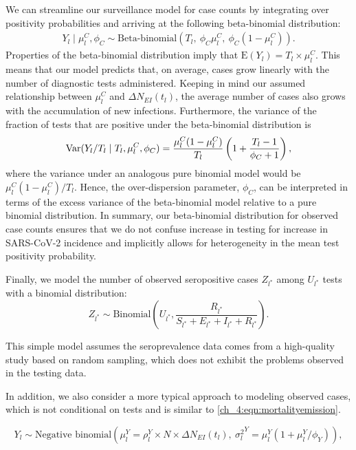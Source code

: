 \par We can streamline our surveillance model for case counts by integrating over positivity probabilities and arriving at the following beta-binomial distribution:
\begin{align}
\label{ch_4:eqn:caseemission}
Y_l\mid \mu_l^C,\phi_C \sim \text{Beta-binomial}\left (T_l,\ \phi_C \mu^C_l,\ \phi_C \left (1 - \mu^C_l\right )\right ).
\end{align}
Properties of the beta-binomial distribution imply that $\text{E}(Y_l) = T_l \times \mu^C_l$.
This means that our model predicts that, on average, cases grow linearly with the number of diagnostic tests administered.
Keeping in mind our assumed relationship between $\mu^C_l$ and $\Delta N_{E I}(t_l)$, the average number of cases also grows with the accumulation of new infections.
Furthermore, the variance of the fraction of tests that are positive under the beta-binomial distribution is
\[
\operatorname{Var}(Y_l/T_l\mid T_l, \mu_l^C, \phi_C) = \frac{\mu_l^C(1-\mu_l^C)}{T_l}\left (1 + \frac{T_l - 1}{\phi_C+1}\right ),
\]
where the variance under an analogous pure binomial model would be $ \mu_l^C(1-\mu_l^C)/T_l $. Hence, the over-dispersion parameter, $ \phi_C $, can be interpreted in terms of the excess variance of the beta-binomial model relative to a pure binomial distribution.
In summary, our beta-binomial distribution for observed case counts ensures that we do not confuse increase in testing for increase in SARS-CoV-2 incidence and implicitly allows for heterogeneity in the mean test positivity probability.

Finally, we model the number of observed seropositive cases $Z_{l^*}$ among $U_{l^*}$ tests with a binomial distribution:
\begin{equation}
\label{ch_4:eqn:seroprevemission}
    Z_{l^*} \sim \text{Binomial}\left( U_{l^*}, \frac{R_{l^*}}{S_{l^*} + E_{l^*} + I_{l^*} + R_{l^*}} \right).
\end{equation}

This simple model assumes the seroprevalence data comes from a high-quality study based on random sampling, which does not exhibit the problems observed in the testing data.

In addition, we also consider a more typical approach to modeling observed cases, which is not conditional on tests and is similar to \eqref{ch_4:eqn:mortalityemission}.

\begin{equation}
    \label{ch_4:eqn:altcaseemission}
    Y_l \sim \text{Negative binomial}\left (\mu^Y_l =  \rho_l^Y \times N \times \Delta N_{E I}(t_l),\ {\sigma^2_l}^Y = \mu^Y_l (1 + \mu^Y_l / \phi_Y )\right ),
\end{equation}

